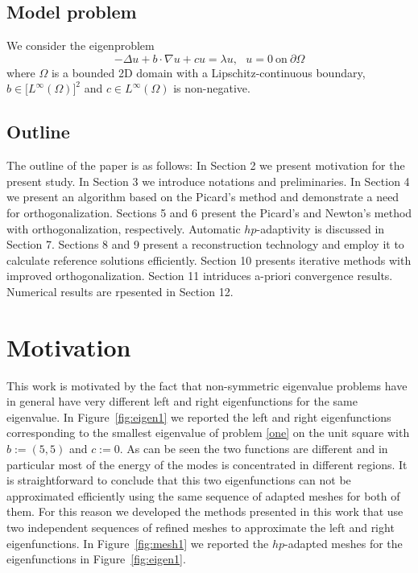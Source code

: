 \documentclass[smallextended]{svjour3}
\begin{document}
\subsection{Model problem}

We consider the eigenproblem
\begin{equation} \label{one}
-\Delta u + b\cdot\nabla u + cu = \lambda u, \ \ \ u = 0 \ \mbox{on} \ \partial \Omega
\end{equation}
where $\Omega$ is a bounded 2D domain with a Lipschitz-continuous boundary,
$b \in \big[L^\infty(\Omega)\big]^2$ and $c\in L^\infty(\Omega)$ is non-negative.


\subsection{Outline}

The outline of the paper is as follows: In Section 2 we present motivation 
for the present study. In Section 3 we introduce notations and preliminaries. 
In Section 4 we present an algorithm based on the Picard's method and demonstrate 
a need for orthogonalization. Sections 5 and 6 present the Picard's and Newton's
method with orthogonalization, respectively. Automatic $hp$-adaptivity is discussed in 
Section 7. Sections 8 and 9 present a reconstruction technology and employ it to 
calculate reference solutions efficiently. Section 10 presents iterative methods 
with improved orthogonalization. Section 11 intriduces a-priori convergence results. 
Numerical results are rpesented in Section 12.



\section{Motivation}\label{sec:motiv}

This work is motivated by the fact that non-symmetric eigenvalue problems have in general have very different left and right eigenfunctions for the same eigenvalue.
In Figure~\ref{fig:eigen1} we reported the left and right eigenfunctions corresponding to the smallest eigenvalue of problem \eqref{one} on the unit square with $b:=(5,5)$ and $c:=0$. 
As can be seen the two functions are different and in particular most of the energy of the modes is concentrated in different regions. It is straightforward to conclude that this two eigenfunctions can not be approximated efficiently using the same sequence of adapted meshes for both of them. For this reason we developed the methods presented in this work that use two independent sequences of refined meshes to approximate the left and right eigenfunctions.
In Figure~\ref{fig:mesh1} we reported the $hp$-adapted meshes for the eigenfunctions in Figure~\ref{fig:eigen1}.
\end{document}
